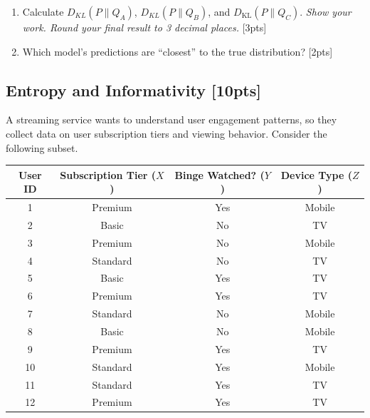 \begin{enumerate}[label=\alph*.]
    \item Calculate $D_{KL}(P \| Q_A)$, $D_{KL}(P \| Q_B)$, and $D_{\text{KL}}(P \| Q_C)$. \emph{Show your work. Round your final result to 3 decimal places.} [3pts]
    \item Which model's predictions are ``closest'' to the true distribution? [2pts] %
\end{enumerate}



\newpage
\subsection{Entropy and Informativity [10pts]}

A streaming service wants to understand user engagement patterns, so they collect data on user subscription tiers and viewing behavior. Consider the following subset.

\begin{table}[H] %
    \centering
    \begin{tabular}{|c|c|c|c|}
        \hline
        \textbf{User ID} & \textbf{Subscription Tier ($X$)} & \textbf{Binge Watched? ($Y$)} & \textbf{Device Type ($Z$)} \\
        \hline
        1 & Premium  & Yes & Mobile \\ \hline
        2 & Basic    & No  & TV     \\ \hline
        3 & Premium  & No  & Mobile \\ \hline
        4 & Standard & No  & TV     \\ \hline
        5 & Basic    & Yes & TV     \\ \hline
        6 & Premium  & Yes & TV     \\ \hline
        7 & Standard & No  & Mobile \\ \hline
        8 & Basic    & No  & Mobile \\ \hline
        9 & Premium  & Yes & TV     \\ \hline
        10 & Standard & Yes & Mobile \\ \hline
        11 & Standard & Yes & TV   \\ \hline
        12 & Premium & Yes & TV    \\ \hline
    \end{tabular}
\end{table}

